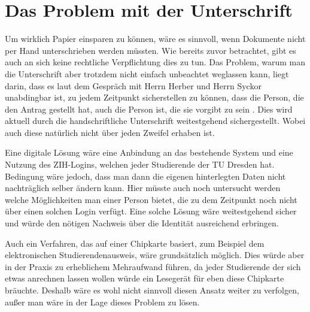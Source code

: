 \section{Das Problem mit der Unterschrift}

Um wirklich Papier einsparen zu können, wäre es sinnvoll, wenn Dokumente nicht per Hand unterschrieben werden müssten. Wie bereits zuvor betrachtet, gibt es auch an sich keine rechtliche Verpflichtung dies zu tun. Das Problem, warum man die Unterschrift aber trotzdem nicht einfach unbeachtet weglassen kann, liegt darin, dass es laut dem Gespräch mit Herrn Herber und Herrn Syckor unabdingbar ist, zu jedem Zeitpunkt sicherstellen zu können, dass die Person, die den Antrag gestellt hat, auch die Person ist, die sie vorgibt zu sein \parencite{protokoll}. Dies wird aktuell durch die handschriftliche Unterschrift weitestgehend sichergestellt. Wobei auch diese natürlich nicht über jeden Zweifel erhaben ist.

Eine digitale Lösung wäre eine Anbindung an das bestehende System und eine Nutzung des ZIH-Logins, welchen jeder Studierende der TU Dresden hat. Bedingung wäre jedoch, dass man dann die eigenen hinterlegten Daten nicht nachträglich selber ändern kann. Hier müsste auch noch untersucht werden welche Möglichkeiten man einer Person bietet, die zu dem Zeitpunkt noch nicht über einen solchen Login verfügt. Eine solche Lösung wäre weitestgehend sicher und würde den nötigen Nachweis über die Identität ausreichend erbringen.

Auch ein Verfahren, das auf einer Chipkarte basiert, zum Beispiel dem elektronischen Studierendenausweis, wäre grundsätzlich möglich. Dies würde aber in der Praxis zu erheblichem Mehraufwand führen, da jeder Studierende der sich etwas anrechnen lassen wollen würde ein Lesegerät für eben diese Chipkarte bräuchte. Deshalb wäre es wohl nicht sinnvoll diesen Ansatz weiter zu verfolgen, außer man wäre in der Lage dieses Problem zu lösen.

